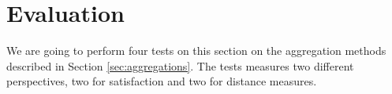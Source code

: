 \section{Evaluation}\label{sec:evaluation}
We are going to perform four tests on this section on the aggregation methods described in Section \ref{sec:aggregations}. The tests measures two different perspectives, two for satisfaction and two for distance measures.

